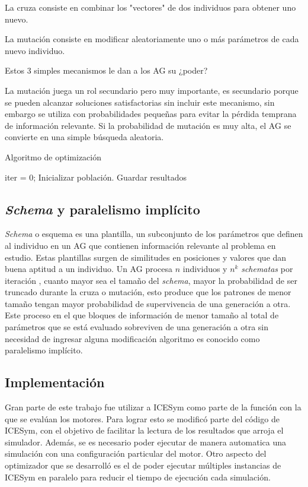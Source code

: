 La cruza consiste en combinar los "vectores" de dos individuos para obtener uno
nuevo.

La mutación consiste en modificar aleatoriamente uno o más parámetros de cada
nuevo individuo.

Estos 3 simples mecanismos le dan a los AG su ¿poder?

La mutación juega un rol secundario pero muy importante, es secundario porque se
pueden alcanzar soluciones satisfactorias sin incluir este mecanismo, sin
embargo se utiliza con probabilidades pequeñas para evitar la pérdida temprana
de información relevante.
%
Si la probabilidad de mutación es muy alta, el AG se convierte en una simple
búsqueda aleatoria.


\begin{algorithm}
 \caption{Algoritmo de optimización}
 \label{algo:genetico}
     \SetAlgoLined
     iter = 0;
     Inicializar población.\;
     {Guardar resultados\;}
\end{algorithm}


\subsection{\emph{Schema} y paralelismo implícito}

\emph{Schema} o esquema es una plantilla, un subconjunto de los parámetros que
definen al individuo en un AG que contienen información relevante al problema
en estudio.
%
Estas plantillas surgen de similitudes en posiciones y valores que dan buena
aptitud a un individuo.
%
Un AG procesa $n$ individuos y $n^k$ \emph{schematas} por iteración
\cite{goldberg}, cuanto mayor sea el tamaño del \emph{schema}, mayor la
probabilidad de ser truncado durante la cruza o mutación, esto produce que los
patrones de menor tamaño tengan mayor probabilidad de supervivencia de una
generación a otra.
%
Este proceso en el que bloques de información de menor tamaño al total de
parámetros que se está evaluado sobreviven de una generación a otra sin
necesidad de ingresar alguna modificación algoritmo es conocido como paralelismo
implícito.


\subsection{Implementación}
%
Gran parte de este trabajo fue utilizar a ICESym como parte de la función con la
que se evalúan los motores.
%
Para lograr esto se modificó parte del código de ICESym, con el objetivo de
facilitar la lectura de los resultados que arroja el simulador.
%
Además, se es necesario poder ejecutar de manera automatica una simulación con
una configuración particular del motor.
%
Otro aspecto del optimizador que se desarrolló es el de poder ejecutar múltiples
instancias de ICESym en paralelo para reducir el tiempo de ejecución cada
simulación.


